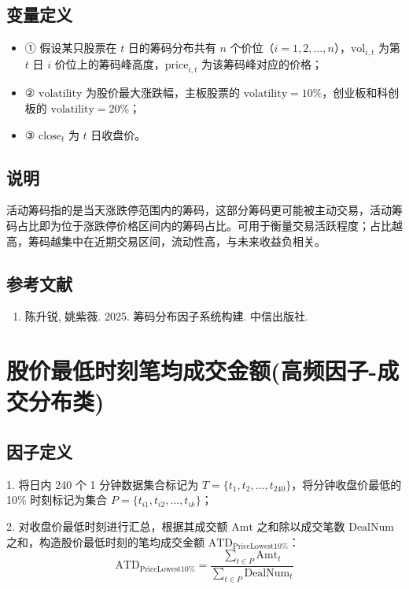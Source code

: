 \documentclass{article}
\begin{document}
\subsection{变量定义}
\begin{itemize}
    \item ① 假设某只股票在 \( t \) 日的筹码分布共有 \( n \) 个价位（\( i = 1, 2, \ldots, n \)），\( \mathrm{vol}_{i,t} \) 为第 \( t \) 日 \( i \) 价位上的筹码峰高度，\( \mathrm{price}_{i,t} \) 为该筹码峰对应的价格；
    \item ② \( \mathrm{volatility} \) 为股价最大涨跌幅，主板股票的 \( \mathrm{volatility} = 10\% \)，创业板和科创板的 \( \mathrm{volatility} = 20\% \)；
    \item ③ \( \mathrm{close}_t \) 为 \( t \) 日收盘价。
\end{itemize}

\subsection{说明}
活动筹码指的是当天涨跌停范围内的筹码，这部分筹码更可能被主动交易，活动筹码占比即为位于涨跌停价格区间内的筹码占比。可用于衡量交易活跃程度；占比越高，筹码越集中在近期交易区间，流动性高，与未来收益负相关。

\subsection{参考文献}
\begin{enumerate}
    \item 陈升锐, 姚紫薇. 2025. 筹码分布因子系统构建. 中信出版社.
\end{enumerate}

\section{股价最低时刻笔均成交金额(高频因子-成交分布类)}

\subsection{因子定义}

1. 将日内 240 个 1 分钟数据集合标记为 \( T = \{t_1, t_2, \dots, t_{240}\} \)，将分钟收盘价最低的 10\% 时刻标记为集合 \( P = \{t_{i1}, t_{i2}, \dots, t_{ik}\} \)；

2. 对收盘价最低时刻进行汇总，根据其成交额 \( \mathrm{Amt} \) 之和除以成交笔数 \( \mathrm{DealNum} \) 之和，构造股价最低时刻的笔均成交金额 \( \mathrm{ATD}_{\mathrm{PriceLowest10\%}} \)：
\begin{equation}
    \mathrm{ATD}_{\mathrm{PriceLowest10\%}} = \frac{\sum_{t \in P} \mathrm{Amt}_t}{\sum_{t \in P} \mathrm{DealNum}_t}
\end{equation}
\end{document}
